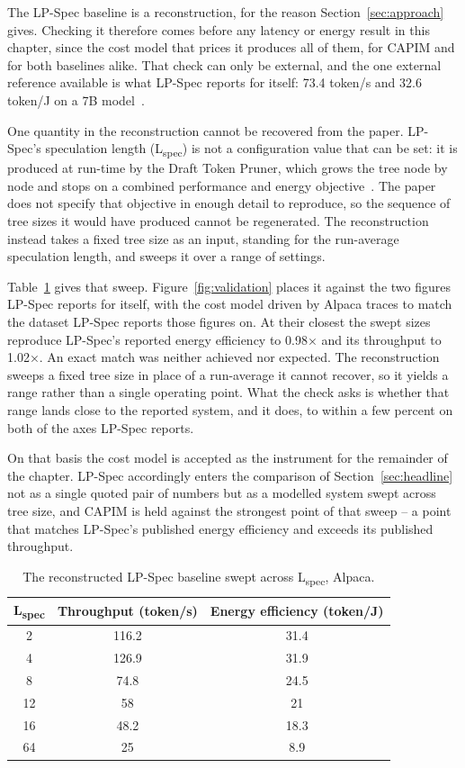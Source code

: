 \documentclass[11pt]{article}
\begin{document}
The LP-Spec baseline is a reconstruction, for the reason Section~\ref{sec:approach} gives. Checking it therefore comes before any latency or energy result in this chapter, since the cost model that prices it produces all of them, for CAPIM and for both baselines alike. That check can only be external, and the one external reference available is what LP-Spec reports for itself: 73.4 token/s and 32.6 token/J on a 7B model~\cite{he2025lpspec}.

One quantity in the reconstruction cannot be recovered from the paper. LP-Spec's speculation length (L\textsubscript{spec}) is not a configuration value that can be set: it is produced at run-time by the Draft Token Pruner, which grows the tree node by node and stops on a combined performance and energy objective~\cite{he2025lpspec}. The paper does not specify that objective in enough detail to reproduce, so the sequence of tree sizes it would have produced cannot be regenerated. The reconstruction instead takes a fixed tree size as an input, standing for the run-average speculation length, and sweeps it over a range of settings.

Table~\ref{tab:lsweep} gives that sweep. Figure~\ref{fig:validation} places it against the two figures LP-Spec reports for itself, with the cost model driven by Alpaca traces to match the dataset LP-Spec reports those figures on. At their closest the swept sizes reproduce LP-Spec's reported energy efficiency to 0.98× and its throughput to 1.02×. An exact match was neither achieved nor expected. The reconstruction sweeps a fixed tree size in place of a run-average it cannot recover, so it yields a range rather than a single operating point. What the check asks is whether that range lands close to the reported system, and it does, to within a few percent on both of the axes LP-Spec reports.

On that basis the cost model is accepted as the instrument for the remainder of the chapter. LP-Spec accordingly enters the comparison of Section~\ref{sec:headline} not as a single quoted pair of numbers but as a modelled system swept across tree size, and CAPIM is held against the strongest point of that sweep -- a point that matches LP-Spec's published energy efficiency and exceeds its published throughput.

\begin{table}[H]
\centering
\footnotesize
\begin{tabular}{ccc}
\toprule
L\textsubscript{spec} & Throughput (token/s) & Energy efficiency (token/J) \\
\midrule
2 & 116.2 & 31.4 \\
4 & 126.9 & 31.9 \\
8 & 74.8 & 24.5 \\
12 & 58 & 21 \\
16 & 48.2 & 18.3 \\
64 & 25 & 8.9 \\
\bottomrule
\end{tabular}
\caption{The reconstructed LP-Spec baseline swept across L\textsubscript{spec}, Alpaca.}
\label{tab:lsweep}
\end{table}
\end{document}

